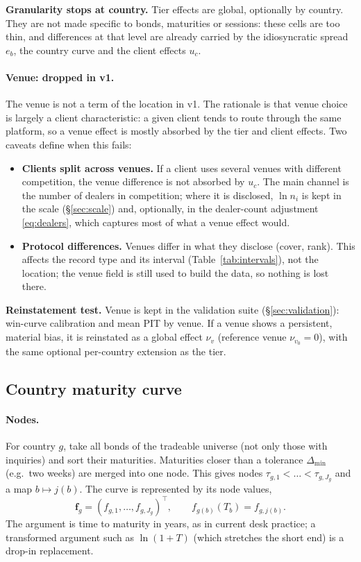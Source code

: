 \documentclass[11pt,a4paper]{article}
\theoremstyle{definition}
\theoremstyle{remark}
\newcommand{\T}{^{\top}}
\newcommand{\bff}{\bm{f}}
\begin{document}
\begin{decision}
\textbf{Granularity stops at country.} Tier effects are global, optionally by country. They are not made specific to bonds, maturities or sessions: these cells are too thin, and differences at that level are already carried by the idiosyncratic spread $e_b$, the country curve and the client effects $u_c$.
\end{decision}

\paragraph{Venue: dropped in v1.} The venue is not a term of the location in v1. The rationale is that venue choice is largely a client characteristic: a given client tends to route through the same platform, so a venue effect is mostly absorbed by the tier and client effects. Two caveats define when this fails:
\begin{itemize}[itemsep=1pt]
\item \textbf{Clients split across venues.} If a client uses several venues with different competition, the venue difference is not absorbed by $u_c$. The main channel is the number of dealers in competition; where it is disclosed, $\ln n_i$ is kept in the scale (\S\ref{sec:scale}) and, optionally, in the dealer-count adjustment \eqref{eq:dealers}, which captures most of what a venue effect would.
\item \textbf{Protocol differences.} Venues differ in what they disclose (cover, rank). This affects the record type and its interval (Table~\ref{tab:intervals}), not the location; the venue field is still used to build the data, so nothing is lost there.
\end{itemize}
\textbf{Reinstatement test.} Venue is kept in the validation suite (\S\ref{sec:validation}): win-curve calibration and mean PIT by venue. If a venue shows a persistent, material bias, it is reinstated as a global effect $\nu_v$ (reference venue $\nu_{v_0}=0$), with the same optional per-country extension as the tier.

\subsection{Country maturity curve}\label{sec:curve}

\paragraph{Nodes.} For country $g$, take all bonds of the tradeable universe (not only those with inquiries) and sort their maturities. Maturities closer than a tolerance $\Delta_{\min}$ (e.g.\ two weeks) are merged into one node. This gives nodes $\tau_{g,1}<\dots<\tau_{g,J_g}$ and a map $b\mapsto j(b)$. The curve is represented by its node values,
\[
\bff_g=(f_{g,1},\dots,f_{g,J_g})\T,\qquad f_{g(b)}(T_b)=f_{g,j(b)} .
\]
The argument is time to maturity in years, as in current desk practice; a transformed argument such as $\ln(1+T)$ (which stretches the short end) is a drop-in replacement.
\end{document}

